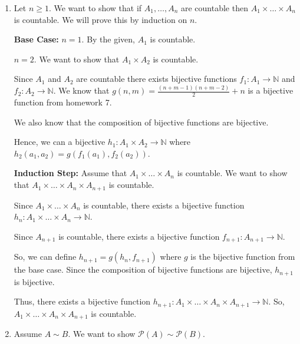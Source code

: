 \documentclass[12pt]{article}
\begin{document}

\begin{enumerate}[start=1,label={\bfseries Exercise \arabic*:},leftmargin=1in] %
    \item Let $n \geq 1$. We want to show that if $A_{1}, \dots, A_{n}$ are countable then $A_{1} \times \dots \times A_{n}$ is countable. We will prove this by induction on $n$.
    
    \textbf{Base Case:} $n = 1$. By the given, $A_{1}$ is countable. 

    $n = 2$. We want to show that $A_{1} \times A_{2}$ is countable. 

    Since $A_{1}$ and $A_{2}$ are countable there exists bijective functions $f_{1}: A_{1} \rightarrow \mathbb{N}$ and $f_{2}: A_{2} \rightarrow \mathbb{N}$. 
    We know that $g(n, m) = \frac{(n+m-1)(n+m-2)}{2}+n$ is a bijective function from homework 7. 

    We also know that the composition of bijective functions are bijective. 

    Hence, we can a bijective $h_{1}: A_{1} \times A_{2} \rightarrow \mathbb{N}$ where $h_{2}(a_{1}, a_{2}) = g(f_{1}(a_{1}), f_{2}(a_{2}))$.

    \textbf{Induction Step:} Assume that $A_{1} \times \dots \times A_{n}$ is countable. We want to show that $A_{1} \times \dots \times A_{n} \times A_{n+1}$ is countable.

    Since $A_{1} \times \dots \times A_{n}$ is countable, there exists a bijective function $h_{n}: A_{1} \times \dots \times A_{n} \rightarrow \mathbb{N}$.

    Since $A_{n+1}$ is countable, there exists a bijective function $f_{n+1}: A_{n+1} \rightarrow \mathbb{N}$.

    So, we can define $h_{n+1} = g(h_{n}, f_{n+1})$ where $g$ is the bijective function from the base case.
    Since the composition of bijective functions are bijective, $h_{n+1}$ is bijective.

    Thus, there exists a bijective function $h_{n+1}: A_{1} \times \dots \times A_{n} \times A_{n+1} \rightarrow \mathbb{N}$. So, $A_{1} \times \dots \times A_{n} \times A_{n+1}$ is countable.

    \item Assume $A\sim B$. We want to show $\mathcal{P}(A) \sim \mathcal{P}(B)$.
    

\end{enumerate}
\end{document}
